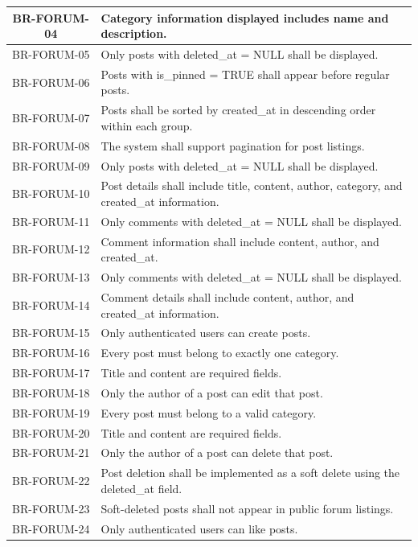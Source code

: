 \begin{longtable}{|c|p{12cm}|}
    BR-FORUM-04 & Category information displayed includes name and description. \\ \hline
    BR-FORUM-05 & Only posts with deleted\_at = NULL shall be displayed. \\ \hline
    BR-FORUM-06 & Posts with is\_pinned = TRUE shall appear before regular posts. \\ \hline
    BR-FORUM-07 & Posts shall be sorted by created\_at in descending order within each group. \\ \hline
    BR-FORUM-08 & The system shall support pagination for post listings. \\ \hline
    BR-FORUM-09 & Only posts with deleted\_at = NULL shall be displayed. \\ \hline
    BR-FORUM-10 & Post details shall include title, content, author, category, and created\_at information. \\ \hline
    BR-FORUM-11 & Only comments with deleted\_at = NULL shall be displayed. \\ \hline
    BR-FORUM-12 & Comment information shall include content, author, and created\_at. \\ \hline
    BR-FORUM-13 & Only comments with deleted\_at = NULL shall be displayed. \\ \hline
    BR-FORUM-14 & Comment details shall include content, author, and created\_at information. \\ \hline
    BR-FORUM-15 & Only authenticated users can create posts. \\ \hline
    BR-FORUM-16 & Every post must belong to exactly one category. \\ \hline
    BR-FORUM-17 & Title and content are required fields. \\ \hline
    BR-FORUM-18 & Only the author of a post can edit that post. \\ \hline
    BR-FORUM-19 & Every post must belong to a valid category. \\ \hline
    BR-FORUM-20 & Title and content are required fields. \\ \hline
    BR-FORUM-21 & Only the author of a post can delete that post. \\ \hline
    BR-FORUM-22 & Post deletion shall be implemented as a soft delete using the deleted\_at field. \\ \hline
    BR-FORUM-23 & Soft-deleted posts shall not appear in public forum listings. \\ \hline
    BR-FORUM-24 & Only authenticated users can like posts. \\ \hline

\end{longtable}
